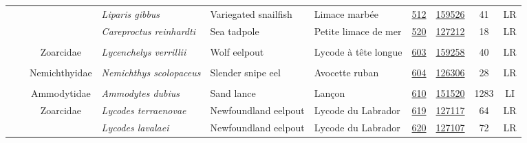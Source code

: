 \documentclass[12pt]{article}\usepackage[]{graphicx}\usepackage[]{color}
\begin{document}
\begin{landscape}
\begin{longtable}[t]{ccc>{\centering\arraybackslash}p{3cm}>{\centering\arraybackslash}p{3cm}>{\centering\arraybackslash}p{3cm}>{}c>{}ccc}
\nopagebreak
\hspace{1em}\hspace{1em} &  &  & \em{Liparis gibbus} & Variegated snailfish & Limace marbée & \href{#sec:512}{512} & \href{http://www.marinespecies.org/aphia.php?p=taxdetails&id=159526}{159526} & 41 & LR\\
\nopagebreak
\hspace{1em}\hspace{1em} &  &  & \em{Careproctus reinhardti} & Sea tadpole & Petite limace de mer & \href{#sec:520}{520} & \href{http://www.marinespecies.org/aphia.php?p=taxdetails&id=127212}{127212} & 18 & LR\\
\nopagebreak
\addlinespace[0.3em]
\\
\hspace{1em}\hspace{1em} &  & Zoarcidae & \em{Lycenchelys verrillii} & Wolf eelpout & Lycode à tête longue & \href{#sec:603}{603} & \href{http://www.marinespecies.org/aphia.php?p=taxdetails&id=159258}{159258} & 40 & LR\\
\nopagebreak
\addlinespace[0.3em]
\\
\hspace{1em}\hspace{1em} &  & Nemichthyidae & \em{Nemichthys scolopaceus} & Slender snipe eel & Avocette ruban & \href{#sec:604}{604} & \href{http://www.marinespecies.org/aphia.php?p=taxdetails&id=126306}{126306} & 28 & LR\\
\nopagebreak
\addlinespace[0.3em]
\\
\hspace{1em}\hspace{1em} &  & Ammodytidae & \em{Ammodytes dubius} & Sand lance & Lançon & \href{#sec:610}{610} & \href{http://www.marinespecies.org/aphia.php?p=taxdetails&id=151520}{151520} & 1283 & LI\\
\nopagebreak
\hspace{1em}\hspace{1em} &  & Zoarcidae & \em{Lycodes terraenovae} & Newfoundland eelpout & Lycode du Labrador & \href{#sec:619}{619} & \href{http://www.marinespecies.org/aphia.php?p=taxdetails&id=127117}{127117} & 64 & LR\\
\nopagebreak
\hspace{1em}\hspace{1em} &  &  & \em{Lycodes lavalaei} & Newfoundland eelpout & Lycode du Labrador & \href{#sec:620}{620} & \href{http://www.marinespecies.org/aphia.php?p=taxdetails&id=127107}{127107} & 72 & LR\\

\end{longtable}
\end{landscape}
\end{document}
